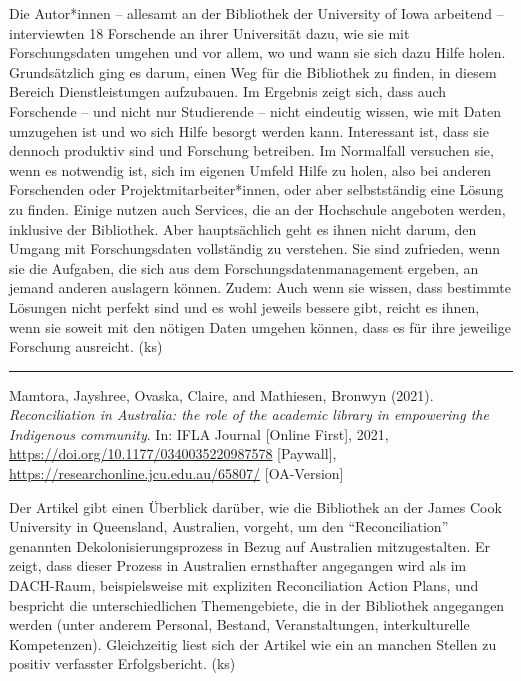 \documentclass[a4paper,
fontsize=11pt,
oneside,
numbers=noperiodatend,
parskip=half-,
bibliography=totoc,
final
]{scrartcl}
\begin{document}
Die Autor*innen -- allesamt an der Bibliothek der University of Iowa
arbeitend -- interviewten 18 Forschende an ihrer Universität dazu, wie
sie mit Forschungsdaten umgehen und vor allem, wo und wann sie sich dazu
Hilfe holen. Grundsätzlich ging es darum, einen Weg für die Bibliothek
zu finden, in diesem Bereich Dienstleistungen aufzubauen. Im Ergebnis
zeigt sich, dass auch Forschende -- und nicht nur Studierende -- nicht
eindeutig wissen, wie mit Daten umzugehen ist und wo sich Hilfe besorgt
werden kann. Interessant ist, dass sie dennoch produktiv sind und
Forschung betreiben. Im Normalfall versuchen sie, wenn es notwendig ist,
sich im eigenen Umfeld Hilfe zu holen, also bei anderen Forschenden oder
Projektmitarbeiter*innen, oder aber selbstständig eine Lösung zu finden.
Einige nutzen auch Services, die an der Hochschule angeboten werden,
inklusive der Bibliothek. Aber hauptsächlich geht es ihnen nicht darum,
den Umgang mit Forschungsdaten vollständig zu verstehen. Sie sind
zufrieden, wenn sie die Aufgaben, die sich aus dem
Forschungsdatenmanagement ergeben, an jemand anderen auslagern können.
Zudem: Auch wenn sie wissen, dass bestimmte Lösungen nicht perfekt sind
und es wohl jeweils bessere gibt, reicht es ihnen, wenn sie soweit mit
den nötigen Daten umgehen können, dass es für ihre jeweilige Forschung
ausreicht. (ks)

\begin{center}\rule{0.5\linewidth}{0.5pt}\end{center}

Mamtora, Jayshree, Ovaska, Claire, and Mathiesen, Bronwyn (2021).
\emph{Reconciliation in Australia: the role of the academic library in
empowering the Indigenous community}. In: IFLA Journal {[}Online
First{]}, 2021, \url{https://doi.org/10.1177/0340035220987578}
{[}Paywall{]}, \url{https://researchonline.jcu.edu.au/65807/}
{[}OA-Version{]}

Der Artikel gibt einen Überblick darüber, wie die Bibliothek an der
James Cook University in Queensland, Australien, vorgeht, um den
\enquote{Reconciliation} genannten Dekolonisierungsprozess in Bezug auf
Australien mitzugestalten. Er zeigt, dass dieser Prozess in Australien
ernsthafter angegangen wird als im DACH-Raum, beispielsweise mit
expliziten Reconciliation Action Plans, und bespricht die
unterschiedlichen Themengebiete, die in der Bibliothek angegangen werden
(unter anderem Personal, Bestand, Veranstaltungen, interkulturelle
Kompetenzen). Gleichzeitig liest sich der Artikel wie ein an manchen
Stellen zu positiv verfasster Erfolgsbericht. (ks)
\end{document}
